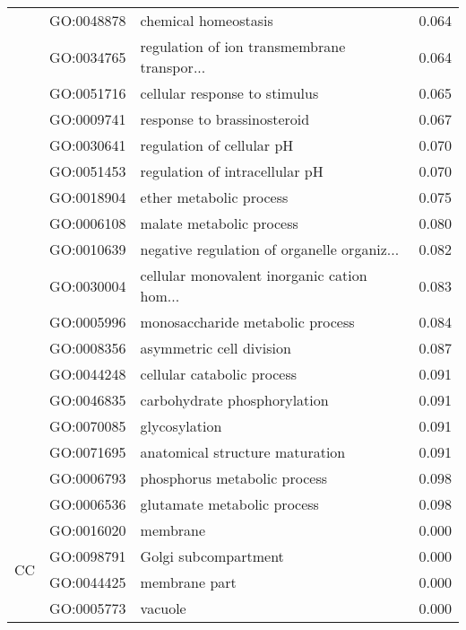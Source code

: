 \begin{longtable}{lllr}
   & GO:0048878 &                         chemical homeostasis &         0.064 \\
   & GO:0034765 &  regulation of ion transmembrane transpor... &         0.064 \\
   & GO:0051716 &                cellular response to stimulus &         0.065 \\
   & GO:0009741 &                  response to brassinosteroid &         0.067 \\
   & GO:0030641 &                    regulation of cellular pH &         0.070 \\
   & GO:0051453 &               regulation of intracellular pH &         0.070 \\
   & GO:0018904 &                      ether metabolic process &         0.075 \\
   & GO:0006108 &                     malate metabolic process &         0.080 \\
   & GO:0010639 &  negative regulation of organelle organiz... &         0.082 \\
   & GO:0030004 &  cellular monovalent inorganic cation hom... &         0.083 \\
   & GO:0005996 &             monosaccharide metabolic process &         0.084 \\
   & GO:0008356 &                     asymmetric cell division &         0.087 \\
   & GO:0044248 &                   cellular catabolic process &         0.091 \\
   & GO:0046835 &                 carbohydrate phosphorylation &         0.091 \\
   & GO:0070085 &                                glycosylation &         0.091 \\
   & GO:0071695 &              anatomical structure maturation &         0.091 \\
   & GO:0006793 &                 phosphorus metabolic process &         0.098 \\
   & GO:0006536 &                  glutamate metabolic process &         0.098 \\
\cline{1-4}
\multirow{34}{*}{CC} & GO:0016020 &                                     membrane &         0.000 \\
   & GO:0098791 &                         Golgi subcompartment &         0.000 \\
   & GO:0044425 &                                membrane part &         0.000 \\
   & GO:0005773 &                                      vacuole &         0.000 \\

\end{longtable}
